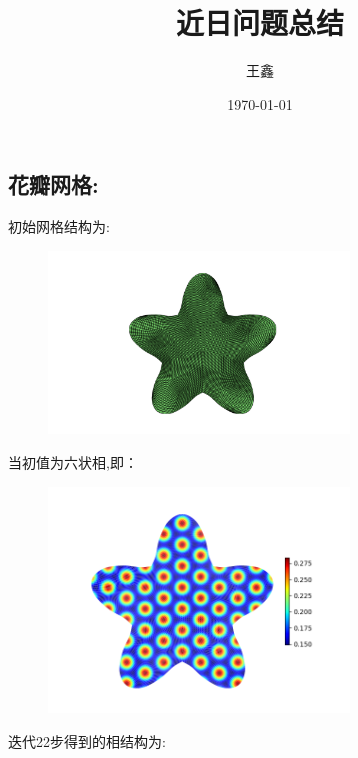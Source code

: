\documentclass[12pt]{article}
\begin{document}
\begin{CJK}{UTF8}{gkai}
    \title{近日问题总结}
    \date{\today}
    \author{王鑫}
    \maketitle
    \section{花瓣网格:}
    初始网格结构为:\\        
    \begin{figure}[H]
     \centering
     \includegraphics[width=8cm]{huaban1.png}
     \caption{}  		
     \end{figure}
当初值为六状相,即：\\
\begin{figure}[H]
	\centering
	\includegraphics[width=8cm]{scftfigure0.png}
	\caption{}  		
\end{figure}
迭代22步得到的相结构为:\\


\end{CJK}
\end{document}
